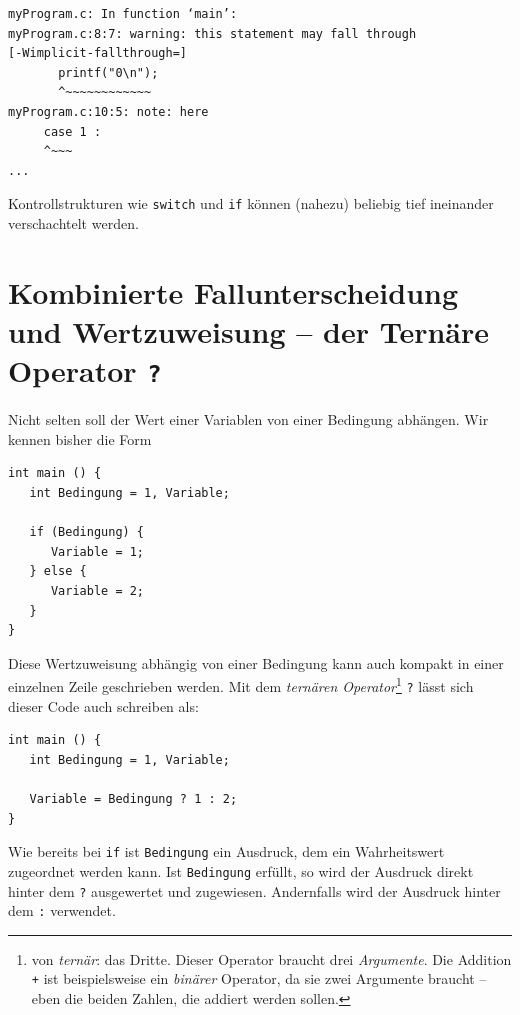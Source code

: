 \begin{cmdbox}
\begin{verbatim}
myProgram.c: In function ‘main’:
myProgram.c:8:7: warning: this statement may fall through 
[-Wimplicit-fallthrough=]
       printf("0\n");
       ^~~~~~~~~~~~~
myProgram.c:10:5: note: here
     case 1 :
     ^~~~
...
\end{verbatim}
\end{cmdbox}

Kontrollstrukturen wie \texttt{switch} und \texttt{if} können (nahezu) beliebig tief ineinander verschachtelt werden.

\section{Kombinierte Fallunterscheidung und Wertzuweisung -- der Ternäre Operator \texttt{?}}
Nicht selten soll der Wert einer Variablen von einer Bedingung abhängen. Wir kennen bisher die Form

\begin{codebox}
\begin{verbatim}
int main () {
   int Bedingung = 1, Variable;
   
   if (Bedingung) {
      Variable = 1;
   } else {
      Variable = 2;
   }
}
\end{verbatim}
\end{codebox}

Diese Wertzuweisung abhängig von einer Bedingung kann auch kompakt in einer einzelnen Zeile geschrieben werden. Mit dem \emph{ternären Operator}\footnote{von \emph{ternär}: das Dritte. Dieser Operator braucht drei \emph{Argumente}. Die Addition \texttt{+} ist beispielsweise ein \emph{binärer} Operator, da sie zwei Argumente braucht -- eben die beiden Zahlen, die addiert werden sollen.} \texttt{?} lässt sich dieser Code auch schreiben als:

\begin{codebox}
\begin{verbatim}
int main () {
   int Bedingung = 1, Variable;
   
   Variable = Bedingung ? 1 : 2;
}
\end{verbatim}
\end{codebox}

Wie bereits bei \texttt{if} ist \texttt{Bedingung} ein Ausdruck, dem ein Wahrheitswert zugeordnet werden kann. Ist \texttt{Bedingung} erfüllt, so wird der Ausdruck direkt hinter dem \texttt{?} ausgewertet und zugewiesen. Andernfalls wird der Ausdruck hinter dem \texttt{:} verwendet.

